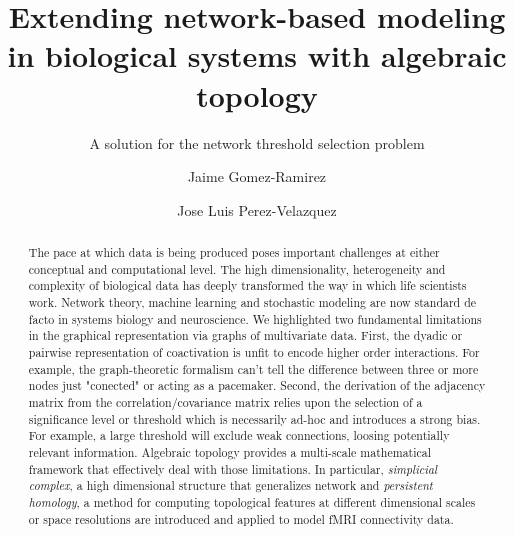 \documentclass[onecollarge,runningheads]{svjour2}
\begin{document}
\title{Extending network-based modeling in biological systems with algebraic topology
}
\subtitle{A solution for the network threshold selection problem\\ }
\author{Jaime Gomez-Ramirez        \and
        Jose Luis Perez-Velazquez %
}
\maketitle

\begin{abstract}
The pace at which data is being produced poses important challenges at either conceptual and computational level. The high dimensionality, heterogeneity and complexity of biological data has deeply transformed the way in which life scientists work. Network theory, machine learning and stochastic modeling are now standard de facto in systems biology and neuroscience.
We highlighted two fundamental limitations in the graphical representation via graphs of multivariate data. First, the dyadic or pairwise representation of coactivation is unfit to encode higher order interactions. For example, the graph-theoretic formalism can't tell the difference between three or more nodes just "conected" or acting as a pacemaker. Second, the derivation of the adjacency matrix from the correlation/covariance matrix relies upon the selection of a significance level or threshold which is necessarily ad-hoc and introduces a strong bias. For example, a large threshold will exclude weak connections, loosing potentially relevant information.
Algebraic topology provides a multi-scale mathematical framework that effectively deal with those limitations. In particular, \emph{simplicial complex}, a high dimensional structure that generalizes network and \emph{persistent homology}, a method for computing topological features at different dimensional scales or space resolutions are introduced and applied to model fMRI connectivity data.

\end{abstract}
\end{document}

